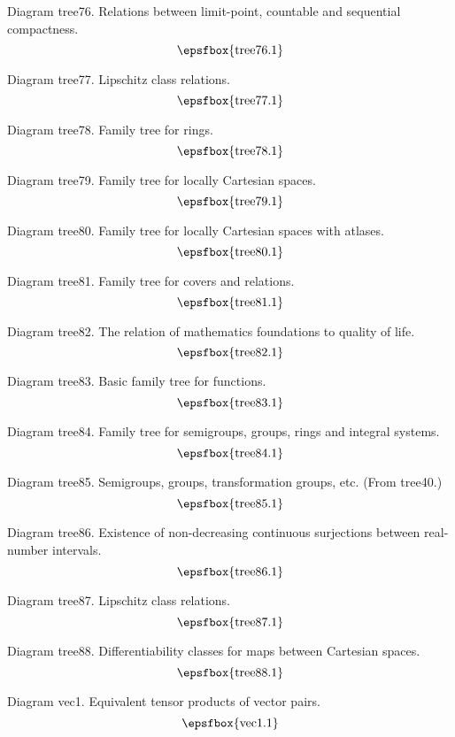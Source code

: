\filleject

Diagram tree76. Relations between limit-point, countable and sequential
compactness.
$$
\centerline{\epsfbox{tree76.1}}
$$

Diagram tree77. Lipschitz class relations.
$$
\centerline{\epsfbox{tree77.1}}
$$

Diagram tree78. Family tree for rings.
$$
\centerline{\epsfbox{tree78.1}}
$$

\filleject

Diagram tree79. Family tree for locally Cartesian spaces.
$$
\centerline{\epsfbox{tree79.1}}
$$

Diagram tree80. Family tree for locally Cartesian spaces with atlases.
$$
\centerline{\epsfbox{tree80.1}}
$$

Diagram tree81. Family tree for covers and relations.
$$
\centerline{\epsfbox{tree81.1}}
$$

Diagram tree82. The relation of mathematics foundations to quality of life.
$$
\centerline{\epsfbox{tree82.1}}
$$

Diagram tree83. Basic family tree for functions.
$$
\centerline{\epsfbox{tree83.1}}
$$

\filleject

Diagram tree84. Family tree for semigroups, groups, rings and integral systems.
$$
\centerline{\epsfbox{tree84.1}}
$$

Diagram tree85. Semigroups, groups, transformation groups, etc. (From tree40.)
$$
\centerline{\epsfbox{tree85.1}}
$$

Diagram tree86. Existence of non-decreasing continuous surjections between
real-number intervals.
$$
\centerline{\epsfbox{tree86.1}}
$$

Diagram tree87. Lipschitz class relations.
$$
\centerline{\epsfbox{tree87.1}}
$$

\filleject

Diagram tree88. Differentiability classes for maps between Cartesian spaces.
$$
\centerline{\epsfbox{tree88.1}}
$$

\secteject
\edef\SECTvec{\the\pageno}

Diagram vec1. Equivalent tensor products of vector pairs.
$$
\centerline{\epsfbox{vec1.1}}
$$

